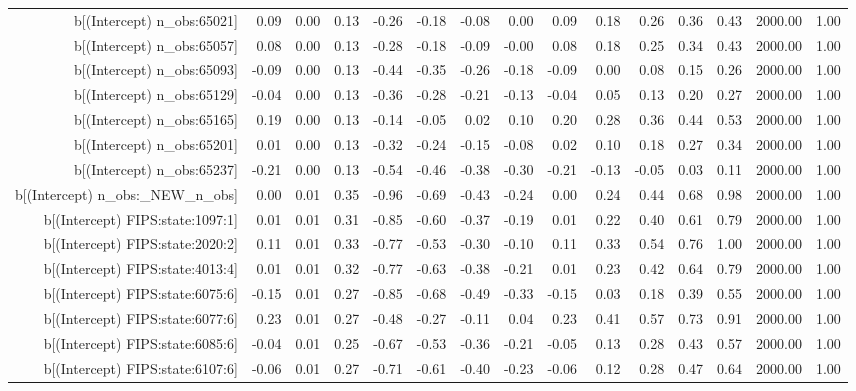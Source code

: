 \begin{table}[ht]
\begin{tabular}{rrrrrrrrrrrrrrr}
  b[(Intercept) n\_obs:65021] & 0.09 & 0.00 & 0.13 & -0.26 & -0.18 & -0.08 & 0.00 & 0.09 & 0.18 & 0.26 & 0.36 & 0.43 & 2000.00 & 1.00 \\ 
  b[(Intercept) n\_obs:65057] & 0.08 & 0.00 & 0.13 & -0.28 & -0.18 & -0.09 & -0.00 & 0.08 & 0.18 & 0.25 & 0.34 & 0.43 & 2000.00 & 1.00 \\ 
  b[(Intercept) n\_obs:65093] & -0.09 & 0.00 & 0.13 & -0.44 & -0.35 & -0.26 & -0.18 & -0.09 & 0.00 & 0.08 & 0.15 & 0.26 & 2000.00 & 1.00 \\ 
  b[(Intercept) n\_obs:65129] & -0.04 & 0.00 & 0.13 & -0.36 & -0.28 & -0.21 & -0.13 & -0.04 & 0.05 & 0.13 & 0.20 & 0.27 & 2000.00 & 1.00 \\ 
  b[(Intercept) n\_obs:65165] & 0.19 & 0.00 & 0.13 & -0.14 & -0.05 & 0.02 & 0.10 & 0.20 & 0.28 & 0.36 & 0.44 & 0.53 & 2000.00 & 1.00 \\ 
  b[(Intercept) n\_obs:65201] & 0.01 & 0.00 & 0.13 & -0.32 & -0.24 & -0.15 & -0.08 & 0.02 & 0.10 & 0.18 & 0.27 & 0.34 & 2000.00 & 1.00 \\ 
  b[(Intercept) n\_obs:65237] & -0.21 & 0.00 & 0.13 & -0.54 & -0.46 & -0.38 & -0.30 & -0.21 & -0.13 & -0.05 & 0.03 & 0.11 & 2000.00 & 1.00 \\ 
  b[(Intercept) n\_obs:\_NEW\_n\_obs] & 0.00 & 0.01 & 0.35 & -0.96 & -0.69 & -0.43 & -0.24 & 0.00 & 0.24 & 0.44 & 0.68 & 0.98 & 2000.00 & 1.00 \\ 
  b[(Intercept) FIPS:state:1097:1] & 0.01 & 0.01 & 0.31 & -0.85 & -0.60 & -0.37 & -0.19 & 0.01 & 0.22 & 0.40 & 0.61 & 0.79 & 2000.00 & 1.00 \\ 
  b[(Intercept) FIPS:state:2020:2] & 0.11 & 0.01 & 0.33 & -0.77 & -0.53 & -0.30 & -0.10 & 0.11 & 0.33 & 0.54 & 0.76 & 1.00 & 2000.00 & 1.00 \\ 
  b[(Intercept) FIPS:state:4013:4] & 0.01 & 0.01 & 0.32 & -0.77 & -0.63 & -0.38 & -0.21 & 0.01 & 0.23 & 0.42 & 0.64 & 0.79 & 2000.00 & 1.00 \\ 
  b[(Intercept) FIPS:state:6075:6] & -0.15 & 0.01 & 0.27 & -0.85 & -0.68 & -0.49 & -0.33 & -0.15 & 0.03 & 0.18 & 0.39 & 0.55 & 2000.00 & 1.00 \\ 
  b[(Intercept) FIPS:state:6077:6] & 0.23 & 0.01 & 0.27 & -0.48 & -0.27 & -0.11 & 0.04 & 0.23 & 0.41 & 0.57 & 0.73 & 0.91 & 2000.00 & 1.00 \\ 
  b[(Intercept) FIPS:state:6085:6] & -0.04 & 0.01 & 0.25 & -0.67 & -0.53 & -0.36 & -0.21 & -0.05 & 0.13 & 0.28 & 0.43 & 0.57 & 2000.00 & 1.00 \\ 
  b[(Intercept) FIPS:state:6107:6] & -0.06 & 0.01 & 0.27 & -0.71 & -0.61 & -0.40 & -0.23 & -0.06 & 0.12 & 0.28 & 0.47 & 0.64 & 2000.00 & 1.00 \\ 

\end{tabular}
\end{table}
